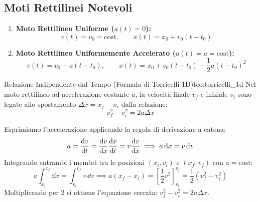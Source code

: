 \subsection{Moti Rettilinei Notevoli}

\begin{enumerate}
    \item \textbf{Moto Rettilineo Uniforme ($a(t) = 0$):}
    \begin{equation}
        v(t) = v_0 = \text{cost}, \qquad x(t) = x_0 + v_0(t - t_0)
    \end{equation}
    
    \item \textbf{Moto Rettilineo Uniformemente Accelerato ($a(t) = a = \text{cost}$):}
    \begin{equation}
        v(t) = v_0 + a(t - t_0), \qquad x(t) = x_0 + v_0(t - t_0) + \frac{1}{2}a(t - t_0)^2
        \label{eq:mrua}
    \end{equation}
\end{enumerate}

\begin{teorema}{Relazione Indipendente dal Tempo (Formula di Torricelli 1D)}{teo:torricelli_1d}
Nel moto rettilineo ad accelerazione costante $a$, la velocità finale $v_f$ e iniziale $v_i$ sono legate allo spostamento $\Delta x = x_f - x_i$ dalla relazione:
\begin{equation}
    v_f^2 - v_i^2 = 2 a \Delta x
    \label{eq:torricelli_1d}
\end{equation}
\end{teorema}

\begin{dimostrazione}
Esprimiamo l'accelerazione applicando la regola di derivazione a catena:
\begin{equation}
    a = \frac{\mathrm{d} v}{\mathrm{d} t} = \frac{\mathrm{d} v}{\mathrm{d} x}\frac{\mathrm{d} x}{\mathrm{d} t} = v \frac{\mathrm{d} v}{\mathrm{d} x} \implies a\,\mathrm{d} x = v\,\mathrm{d} v
\end{equation}
Integrando entrambi i membri tra le posizioni $(x_i, v_i)$ e $(x_f, v_f)$ con $a = \text{cost}$:
\begin{equation}
    a \int_{x_i}^{x_f} \dd x = \int_{v_i}^{v_f} v\,\dd v \implies a(x_f - x_i) = \left[\frac{1}{2}v^2\right]_{v_i}^{v_f} = \frac{1}{2}(v_f^2 - v_i^2)
\end{equation}
Moltiplicando per 2 si ottiene l'equazione cercata: $v_f^2 - v_i^2 = 2 a \Delta x$.
\end{dimostrazione}

